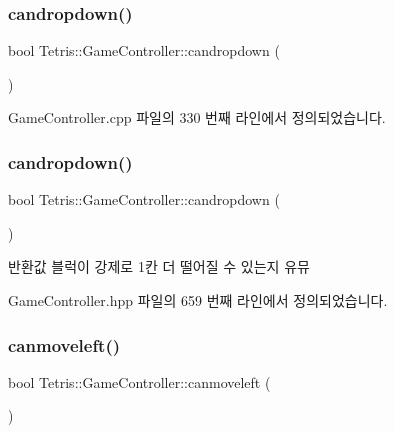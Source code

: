 \subsubsection{\texorpdfstring{candropdown()}{candropdown()}\hspace{0.1cm}{\footnotesize\ttfamily [1/2]}}
{\footnotesize\ttfamily bool Tetris\+::\+Game\+Controller\+::candropdown (\begin{DoxyParamCaption}{ }\end{DoxyParamCaption})}



Game\+Controller.\+cpp 파일의 330 번째 라인에서 정의되었습니다.

\mbox{\label{class_tetris_1_1_game_controller_ac4993d5ad8640ac617fec341fdb301ee}} 
\subsubsection{\texorpdfstring{candropdown()}{candropdown()}\hspace{0.1cm}{\footnotesize\ttfamily [2/2]}}
{\footnotesize\ttfamily bool Tetris\+::\+Game\+Controller\+::candropdown (\begin{DoxyParamCaption}{ }\end{DoxyParamCaption})\hspace{0.3cm}{\ttfamily [inline]}}

\begin{DoxyReturn}{반환값}
블럭이 강제로 1칸 더 떨어질 수 있는지 유뮤 
\end{DoxyReturn}


Game\+Controller.\+hpp 파일의 659 번째 라인에서 정의되었습니다.

\mbox{\label{class_tetris_1_1_game_controller_ae541cf926ccdce47a185c94a0c80b642}} 
\subsubsection{\texorpdfstring{canmoveleft()}{canmoveleft()}\hspace{0.1cm}{\footnotesize\ttfamily [1/2]}}
{\footnotesize\ttfamily bool Tetris\+::\+Game\+Controller\+::canmoveleft (\begin{DoxyParamCaption}{ }\end{DoxyParamCaption})}



